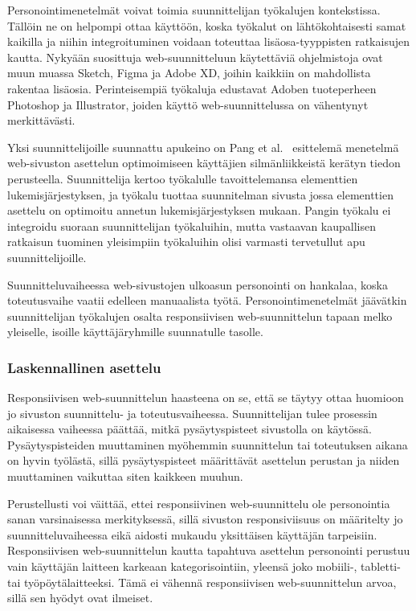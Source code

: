\documentclass[finnish, 12pt, a4paper, elec, utf8, a-1b, online]{aaltothesis}
\begin{document}
Personointimenetelmät voivat toimia suunnittelijan työkalujen kontekstissa.
Tällöin ne on helpompi ottaa käyttöön, koska työkalut on lähtökohtaisesti samat
kaikilla ja niihin integroituminen voidaan toteuttaa lisäosa-tyyppisten
ratkaisujen kautta. Nykyään suosittuja web-suunnitteluun käytettäviä
ohjelmistoja ovat muun muassa Sketch, Figma ja Adobe XD, joihin kaikkiin on
mahdollista rakentaa lisäosia. Perinteisempiä työkaluja edustavat Adoben
tuoteperheen Photoshop ja Illustrator, joiden käyttö web-suunnittelussa on
vähentynyt merkittävästi.

Yksi suunnittelijoille suunnattu apukeino on Pang et al.~\cite{Pang2016}
esittelemä menetelmä web-sivuston asettelun optimoimiseen käyttäjien
silmänliikkeistä kerätyn tiedon perusteella. Suunnittelija kertoo työkalulle
tavoittelemansa elementtien lukemisjärjestyksen, ja työkalu tuottaa suunnitelman
sivusta jossa elementtien asettelu on optimoitu annetun lukemisjärjestyksen
mukaan. Pangin työkalu ei integroidu suoraan suunnittelijan työkaluihin, mutta
vastaavan kaupallisen ratkaisun tuominen yleisimpiin työkaluihin olisi varmasti
tervetullut apu suunnittelijoille.

Suunnitteluvaiheessa web-sivustojen ulkoasun personointi on hankalaa, koska
toteutusvaihe vaatii edelleen manuaalista työtä. Personointimenetelmät jäävätkin
suunnittelijan työkalujen osalta responsiivisen web-suunnittelun tapaan melko
yleiselle, isoille käyttäjäryhmille suunnatulle tasolle.

\subsubsection{Laskennallinen asettelu}

Responsiivisen web-suunnittelun haasteena on se, että se täytyy ottaa huomioon
jo sivuston suunnittelu- ja toteutusvaiheessa. Suunnittelijan tulee prosessin
aikaisessa vaiheessa päättää, mitkä pysäytyspisteet sivustolla on käytössä.
Pysäytyspisteiden muuttaminen myöhemmin suunnittelun tai toteutuksen aikana on
hyvin työlästä, sillä pysäytyspisteet määrittävät asettelun perustan ja niiden
muuttaminen vaikuttaa siten kaikkeen muuhun.

Perustellusti voi väittää, ettei responsiivinen web-suunnittelu ole personointia
sanan varsinaisessa merkityksessä, sillä sivuston responsiviisuus on määritelty
jo suunnitteluvaiheessa eikä aidosti mukaudu yksittäisen käyttäjän tarpeisiin.
Responsiivisen web-suunnittelun kautta tapahtuva asettelun personointi perustuu
vain käyttäjän laitteen karkeaan kategorisointiin, yleensä joko mobiili-,
tabletti- tai työpöytälaitteeksi. Tämä ei vähennä responsiivisen
web-suunnittelun arvoa, sillä sen hyödyt ovat ilmeiset.
\end{document}
